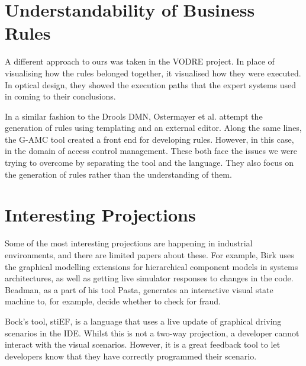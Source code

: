 \section{Understandability of Business Rules}

A different approach to ours was taken in the VODRE project\cite{lapaev2014vodre}.
In place of visualising how the rules belonged together, it visualised how they were executed.
In optical design, they showed the execution paths that the expert systems used in coming to their conclusions.

In a similar fashion to the Drools DMN, Ostermayer et al.\cite{ostermayer2013simplifying} attempt the generation of rules using templating and an external editor.
Along the same lines, the G-AMC tool\cite{sa2016g} created a front end for developing rules.
However, in this case, in the domain of access control management.
These both face the issues we were trying to overcome by separating the tool and the language. 
They also focus on the generation of rules rather than the understanding of them.

\section{Interesting Projections}
Some of the most interesting projections are happening in industrial environments, and there are limited papers about these.
For example, Birk\cite{Birken_Interactive} uses the graphical modelling extensions for hierarchical component models in systems architectures, as well as getting live simulator responses to changes in the code.
Beadman\cite{Beadman_Journey}, as a part of his tool Pasta, generates an interactive visual state machine to, for example, decide whether to check for fraud. 

Bock's tool, stiEF\cite{Bock_stief}, is a language that uses a live update of graphical driving scenarios in the IDE.
Whilst this is not a two-way projection, a developer cannot interact with the visual scenarios.
However, it is a great feedback tool to let developers know that they have correctly programmed their scenario. 